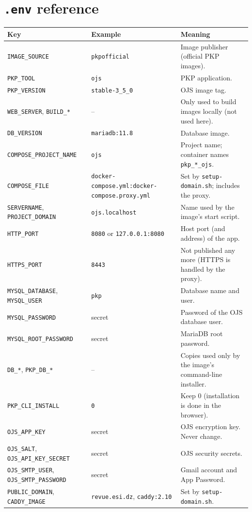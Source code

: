 \documentclass[11pt,a4paper]{report}
\newcommand{\code}[1]{\texttt{\small #1}}
\newcommand{\file}[1]{\texttt{\small #1}}
\begin{document}
\chapter{\texorpdfstring{\texttt{.env}}{.env} reference}\label{app:env}
\begin{longtable}{@{}P{4.6cm}P{3.6cm}P{7.2cm}@{}}
\toprule
\textbf{Key} & \textbf{Example} & \textbf{Meaning} \\
\midrule
\endhead
\bottomrule
\endfoot
\code{IMAGE\_SOURCE}          & \code{pkpofficial}    & Image publisher (official PKP images). \\
\code{PKP\_TOOL}              & \code{ojs}            & PKP application. \\
\code{PKP\_VERSION}           & \code{stable-3\_5\_0} & OJS image tag. \\
\code{WEB\_SERVER}, \code{BUILD\_*} & --              & Only used to build images locally (not used here). \\
\code{DB\_VERSION}            & \code{mariadb:11.8}   & Database image. \\
\code{COMPOSE\_PROJECT\_NAME} & \code{ojs}            & Project name; container names \code{pkp\_*\_ojs}. \\
\code{COMPOSE\_FILE}          & \code{docker-compose.yml:\allowbreak docker-compose.proxy.yml} & Set by \file{setup-domain.sh}; includes the proxy. \\
\code{SERVERNAME}, \code{PROJECT\_DOMAIN} & \code{ojs.localhost} & Name used by the image's start script. \\
\code{HTTP\_PORT}             & \code{8080} or \code{127.0.0.1:8080} & Host port (and address) of the app. \\
\code{HTTPS\_PORT}            & \code{8443}           & Not published any more (HTTPS is handled by the proxy). \\
\code{MYSQL\_DATABASE}, \code{MYSQL\_USER} & \code{pkp} & Database name and user. \\
\code{MYSQL\_PASSWORD}        & secret                & Password of the OJS database user. \\
\code{MYSQL\_ROOT\_PASSWORD}  & secret                & MariaDB root password. \\
\code{DB\_*}, \code{PKP\_DB\_*} & --                  & Copies used only by the image's command-line installer. \\
\code{PKP\_CLI\_INSTALL}      & \code{0}              & Keep 0 (installation is done in the browser). \\
\code{OJS\_APP\_KEY}          & secret                & OJS encryption key. Never change. \\
\code{OJS\_SALT}, \code{OJS\_API\_KEY\_SECRET} & secret & OJS security secrets. \\
\code{OJS\_SMTP\_USER}, \code{OJS\_SMTP\_PASSWORD} & secret & Gmail account and App Password. \\
\code{PUBLIC\_DOMAIN}, \code{CADDY\_IMAGE} & \code{revue.esi.dz}, \code{caddy:2.10} & Set by \file{setup-domain.sh}. \\
\end{longtable}
\end{document}
